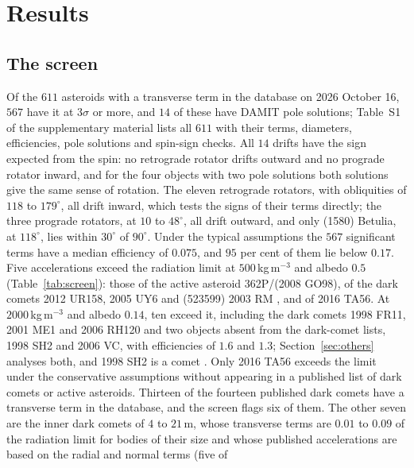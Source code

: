 \documentclass[3p,11pt]{elsarticle}
\begin{document}
\section{Results}\label{sec:results}

\subsection{The screen}

Of the $611$ asteroids with a transverse term in the database on 2026 October 16, $567$
have it at $3\sigma$ or more, and $14$ of these have DAMIT pole solutions; Table~S1 of
the supplementary material lists all $611$ with their terms, diameters, efficiencies,
pole solutions and spin-sign checks. All $14$ drifts have the sign expected from the
spin: no retrograde rotator drifts outward and no prograde rotator inward, and for the
four objects with two pole solutions both solutions give the same sense of rotation. The
eleven retrograde rotators, with obliquities of $118$ to $179^\circ$, all drift inward,
which tests the signs of their terms directly; the three prograde rotators, at $10$ to
$48^\circ$, all drift outward, and only (1580) Betulia, at $118^\circ$, lies within
$30^\circ$ of $90^\circ$. Under the typical assumptions the $567$ significant terms have a
median efficiency of $0.075$, and $95$ per cent of them lie below $0.17$. Five
accelerations exceed the radiation limit at $500$\,kg\,m$^{-3}$ and albedo $0.5$
(Table~\ref{tab:screen}): those of the active asteroid 362P/(2008 GO98), of the dark
comets 2012 UR158, 2005 UY6 and (523599) 2003 RM \citep{Seligman2023,Seligman2024}, and of
2016 TA56. At $2000$\,kg\,m$^{-3}$ and albedo $0.14$, ten exceed it, including the dark
comets 1998 FR11, 2001 ME1 and 2006 RH120 and two objects absent from the dark-comet
lists, 1998 SH2 and 2006 VC, with efficiencies of $1.6$ and $1.3$; Section~\ref{sec:others}
analyses both, and 1998 SH2 is a comet \citep{Farnocchia2026}. Only 2016 TA56 exceeds the
limit under the conservative assumptions without appearing in a published list of dark comets
or active asteroids. Thirteen of
the fourteen published dark comets have a transverse term in the database, and the
screen flags six of them. The other seven are the inner dark comets of $4$ to $21$\,m,
whose transverse terms are $0.01$ to $0.09$ of the radiation limit for bodies of their
size and whose published accelerations are based on the radial and normal terms (five of
\end{document}
